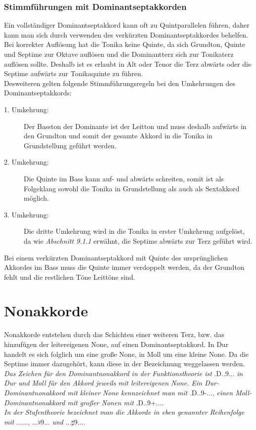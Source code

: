\documentclass[a4paper]{article}
\newcommand{\dShoch}[4]{\HH.\uppercase\expandafter{\romannumeral #1\relax}..#2.#3.#4.} %
\newcommand{\Dhoch}[2]{\HH.D.#2.#1...}
\begin{document}
	\subsubsection{Stimmführungen mit Dominantseptakkorden}
	Ein vollständiger Dominantseptakkord kann oft zu Quintparallelen führen, daher kann man sich durch verwenden des verkürzten Dominantseptakkordes behelfen.\\
	Bei korrekter Auflösung hat die Tonika keine Quinte, da sich Grundton, Quinte und Septime zur Oktave auflösen und die Dominantterz sich zur Tonikaterz auflösen sollte. Deshalb ist es erlaubt in Alt oder Tenor die Terz abwärts oder die Septime aufwärts zur Tonikaquinte zu führen.\\
	Desweiteren gelten folgende Stimmführungsregeln bei den Umkehrungen des Dominantseptakkords:
	\begin{description}
		\item[1. Umkehrung:] Der Basston der Dominante ist der Leitton und muss deshalb aufwärts in den Grundton und somit der gesamte Akkord in die Tonika in Grundstellung geführt werden.
		\item[2. Umkehrung:] Die Quinte im Bass kann auf- und abwärts schreiten, somit ist als Folgeklang sowohl die Tonika in Grundstellung als auch als Sextakkord möglich.
		\item[3. Umkehrung:] Die dritte Umkehrung wird in die Tonika in erster Umkehrung aufgelöst, da wie \textit{Abschnitt 9.1.1} erwähnt, die Septime abwärts zur Terz geführt wird.
	\end{description}
	Bei einem verkürzten Dominantseptakkord mit Quinte des ursprünglichen Akkordes im Bass muss die Quinte immer verdoppelt werden, da der Grundton fehlt und die restlichen Töne Leittöne sind.
	
	\section{Nonakkorde}
	Nonakkorde entstehen durch das Schichten einer weiteren Terz, bzw. das hinzufügen der leitereigenen None, auf einen Dominantseptakkord. In Dur handelt es sich folglich um eine große None, in Moll um eine kleine None. Da die Septime immer dazugehört, kann diese in der Bezeichnung weggelassen werden.\\
	\textit{Das Zeichen für den Dominantnonakkord in der Funktionstheorie ist} \Dhoch{9}{} \textit{in Dur und Moll für den Akkord jeweils mit leitereigenen None. Ein Dur-Dominantnonakkord mit kleiner None kennzeichnet man mit} \Dhoch{9-}{}, \textit{einen Moll-Dominantnonakkord mit großer Nonen mit} \Dhoch{9+}{}.\\
	\textit{In der Stufentheorie bezeichnet man die Akkorde in eben genannter Reihenfolge mit} \dShoch{5}{}{}{}, \dShoch{5}{$\flat$9}{}{} \textit{und} \dShoch{5}{$\sharp$9}{}{}.
	
\end{document}
